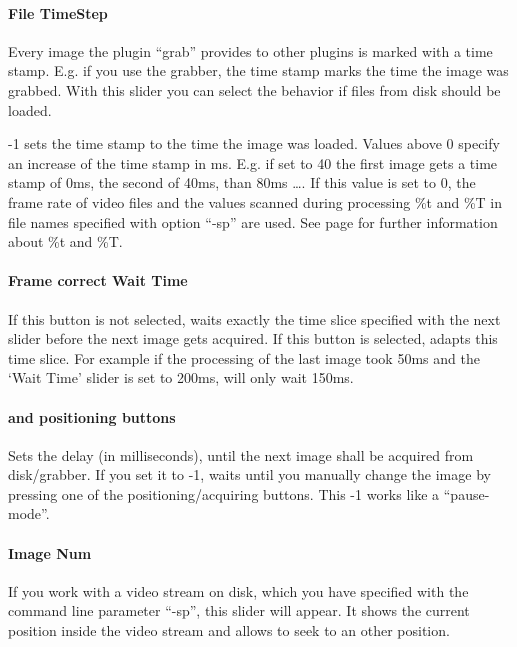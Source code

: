 \paragraph{File TimeStep}
Every image the plugin ``grab'' provides to other plugins is marked
with a time stamp. E.g. if you use the grabber, the time stamp marks
the time the image was grabbed. With this slider you can select the
behavior if files from disk should be loaded.

-1 sets the time stamp to the time the image was loaded. Values
above 0 specify an increase of the time stamp in ms. E.g. if set to
40 the first image gets a time stamp of 0ms, the second of 40ms,
than 80ms \ldots . If this value is set to 0, the frame rate of
video files and the values scanned during processing \%t and \%T in
file names specified with option ``-sp'' are used. See page
 for further information about \%t and
\%T.

\paragraph{Frame correct Wait Time\label{para:waitTimeFrame}}
If this button is not selected, \icewing{} waits exactly the time
slice specified with the next slider before the next image gets
acquired. If this button is selected, \icewing{} adapts this time
slice. For example if the processing of the last image took 50ms
and the `Wait Time' slider is set to 200ms, \icewing{} will only
wait 150ms.

\paragraph{ and positioning buttons\label{para:waitTime}}
Sets the delay (in milliseconds), until the next image shall be
acquired from disk/grabber. If you set it to -1, \icewing{} waits
until you manually change the image by pressing one of the
positioning/acquiring buttons. This -1 works like a ``pause-mode''.

\paragraph{Image Num}
\label{page:gui_image_num}
If you work with a video stream on disk, which you have specified
with the command line parameter ``-sp'', this slider will appear. It
shows the current position inside the video stream and allows to
seek to an other position.


